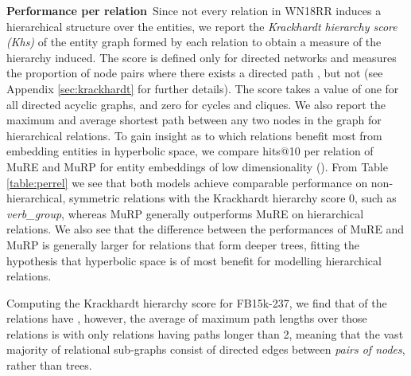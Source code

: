 \documentclass{article}
\newcommand{\keypoint}[1]{\vspace{0.cm}\noindent\textbf{#1}\,}
\begin{document}
\keypoint{Performance per relation} 
Since not every relation in WN18RR induces a hierarchical structure over the entities, we report the \textit{Krackhardt hierarchy score (Khs)} \cite{krackhardt1994graph} of the entity graph formed by each relation to obtain a measure of the hierarchy induced. The score is defined only for directed networks and measures the proportion of node pairs  where there exists a directed path , but not  (see Appendix \ref{sec:krackhardt} for further details). The score takes a value of one for all directed acyclic graphs, and zero for cycles and cliques. We also report the maximum and average shortest path between any two nodes in the graph for hierarchical relations. To gain insight as to which relations benefit most from embedding entities in hyperbolic space, we compare hits@10 per relation of MuRE and MuRP for entity embeddings of low dimensionality (). From Table \ref{table:perrel} we see that both models achieve comparable performance on non-hierarchical, symmetric relations with the Krackhardt hierarchy score 0, such as \textit{verb\_group}, whereas MuRP generally outperforms MuRE on hierarchical relations. We also see that the difference between the performances of MuRE and MuRP is generally larger for relations that form deeper trees, fitting the hypothesis that hyperbolic space is of most benefit for modelling hierarchical relations.

Computing the Krackhardt hierarchy score for FB15k-237, we find that  of the relations have , however, the average of maximum path lengths over those relations is  with only  relations having paths longer than 2, meaning that the vast majority of relational sub-graphs consist of directed edges between \textit{pairs of nodes}, rather than trees.
\end{document}
